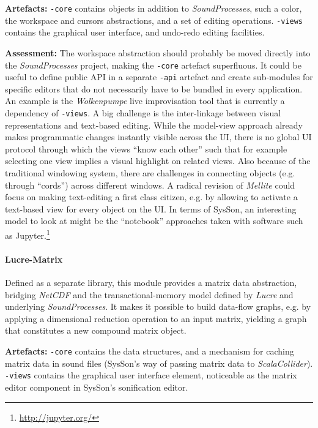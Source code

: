 \documentclass[11pt,a4paper]{article}
\newcommand{\software}[1]{\textit{#1}}
\newcommand{\sysson}[0]{SysSon}
\begin{document}
\textbf{Artefacts:} \verb!-core! contains objects in addition to \software{SoundProcesses}, such a color, the workspace and cursors abstractions, and a set of editing operations. \verb!-views! contains the graphical user interface, and undo-redo editing facilities.

\textbf{Assessment:} The workspace abstraction should probably be moved directly into the \software{SoundProcesses} project, making the \verb!-core! artefact superfluous. It could be useful to define public API in a separate \verb!-api! artefact and create sub-modules for specific editors that do not necessarily have to be bundled in every application. An example is the \software{Wolkenpumpe} live improvisation tool that is currently a dependency of \verb!-views!.
A big challenge is the inter-linkage between visual representations and text-based editing. While the model-view approach already makes programmatic changes instantly visible across the UI, there is no global UI protocol through which the views ``know each other'' such that for example selecting one view implies a visual highlight on related views. Also because of the traditional windowing system, there are challenges in connecting objects (e.g. through ``cords'') across different windows. A radical revision of \software{Mellite} could focus on making text-editing a first class citizen, e.g. by allowing to activate a text-based view for every object on the UI. In terms of \sysson{}, an interesting model to look at might be the ``notebook'' approaches taken with software such as Jupyter.\footnote{\url{http://jupyter.org/}}

\paragraph{Lucre-Matrix}

Defined as a separate library, this module provides a matrix data abstraction, bridging \software{NetCDF} and the transactional-memory model defined by \software{Lucre} and underlying \software{SoundProcesses}. It makes it possible to build data-flow graphs, e.g. by applying a dimensional reduction operation to an input matrix, yielding a graph that constitutes a new compound matrix object.

\textbf{Artefacts:} \verb!-core! contains the data structures, and a mechanism for caching matrix data in sound files (\sysson{}'s way of passing matrix data to \software{ScalaCollider}). \verb!-views! contains the graphical user interface element, noticeable as the matrix editor component in \sysson{}'s sonification editor.
\end{document}

